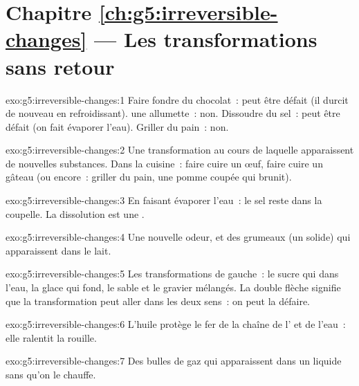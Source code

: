 \section*{Chapitre \ref{ch:g5:irreversible-changes} --- Les transformations sans retour}

\begin{solution}{exo:g5:irreversible-changes:1}
Faire fondre du chocolat~: peut être défait (il durcit de nouveau en
refroidissant).  une allumette~: non. Dissoudre du sel~: peut être
défait (on fait évaporer l'eau). Griller du pain~: non.
\end{solution}

\begin{solution}{exo:g5:irreversible-changes:2}
Une transformation au cours de laquelle apparaissent de nouvelles
substances. Dans la cuisine~: faire cuire un œuf, faire cuire un gâteau
(ou encore~: griller du pain, une pomme coupée qui brunit).
\end{solution}

\begin{solution}{exo:g5:irreversible-changes:3}
En faisant évaporer l'eau~: le sel reste dans la coupelle. La
dissolution est une .
\end{solution}

\begin{solution}{exo:g5:irreversible-changes:4}
Une nouvelle odeur, et des grumeaux (un solide) qui apparaissent dans
le lait.
\end{solution}

\begin{solution}{exo:g5:irreversible-changes:5}
Les transformations de gauche~: le sucre qui  dans l'eau, la
glace qui fond, le sable et le gravier mélangés. La double flèche
signifie que la transformation peut aller dans les deux sens~: on peut
la défaire.
\end{solution}

\begin{solution}{exo:g5:irreversible-changes:6}
L'huile protège le fer de la chaîne de l' et de l'eau~: elle ralentit
la rouille.
\end{solution}

\begin{solution}{exo:g5:irreversible-changes:7}
Des bulles de gaz qui apparaissent dans un liquide sans qu'on le
chauffe.
\end{solution}

